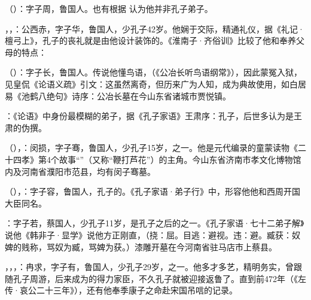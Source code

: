 （）：字子周，鲁国人。也有根据  认为他并非孔子弟子。

，，：公西赤，字子华，鲁国人，少孔子42岁。他娴于交际，精通礼仪，据《礼记·檀弓上》，孔子的丧礼就是由他设计装饰的。《淮南子·齐俗训》比较了他和奉养父母的特点：

（）：字子长，鲁国人。传说他懂鸟语，（《公冶长听鸟语纲常》），因此蒙冤入狱，见皇侃《论语义疏》引文：这虽然离奇，但历来广为人知，成为典故使用，如白居易《池鹤八绝句》诗序：公冶长墓在今山东省诸城市贾悦镇。

：《论语》中身份最模糊的弟子，据《孔子家语》王肃序：孔子，后世多认为是王肃的伪撰。

（），：闵损，字子骞，鲁国人，少孔子15岁，之一。他是元代编录的童蒙读物《二十四孝》第4个故事“”（又称“鞭打芦花”）的主角。今山东省济南市孝文化博物馆内及河南省濮阳市范县，均有闵子骞墓。

（），：字子容，鲁国人，孔子的。《孔子家语·弟子行》中，形容他他和西周开国大臣同名。

：字子若，蔡国人，少孔子11岁，是孔子之后的之一。《孔子家语·七十二弟子解》说他《韩非子·显学》说他方正刚直，（挠：屈。目逃：避视。违：避。臧获：奴婢的贱称，骂奴为臧，骂婢为获。）漆雕开墓在今河南省驻马店市上蔡县。

，，，：冉求，字子有，鲁国人，少孔子29岁，之一。他多才多艺，精明务实，曾跟随孔子周游，后来成为的得力家臣，不久孔子就被迎接返鲁了。直到前472年（《左传·哀公二十三年》），还有他奉季康子之命赴宋国吊唁的记录。

